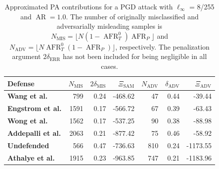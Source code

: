 \begin{table}[H]
    \centering
    \begin{tabular}{l|rrr|rrr}
    Defense & $N_{\text{MIS}}$ & $2 \delta_{\text{MIS}}$ & $\Xi_{\text{SAM}}$ & $N_{\text{ADV}}$ & $\delta_{\text{ADV}}$ & $\Xi_{\text{ADV}}$ \\
    \midrule
    {\color{tab:brown} \textbf{Wang et al.}} & 799 & 0.24 & -468.62 & 47 & 0.44 & -39.44 \\
    {\color{tab:blue} \textbf{Engstrom et al.}} & 1591 & 0.17 & -566.72 & 67 & 0.39 & -63.43 \\
    {\color{tab:red} \textbf{Wong et al.}} & 1562 & 0.17 & -537.25 & 90 & 0.38 & -88.98 \\
    {\color{tab:purple} \textbf{Addepalli et al.}} & 2063 & 0.21 & -877.42 & 75 & 0.46 & -58.92 \\
    {\color{tab:orange} \textbf{Undefended}} & 566 & 0.47 & -736.63 & 810 & 0.24 & -1173.55 \\
    {\color{tab:green} \textbf{Athalye et al.}} & 1915 & 0.23 & -963.85 & 747 & 0.21 & -1183.96 \\
    \bottomrule
    \end{tabular}
    \caption{
    Approximated PA contributions for a PGD attack with $\ell_\infty$ = 8/255 and
    $\operatorname{AR} = 1.0$. The number of originally misclassified and adversarially misleading
    samples is $N_{\text{MIS}} = \lfloor N (1-\operatorname{AFR}_T^0) \operatorname{AFR}_P \rfloor$ and
    $N_{\text{ADV}} = \lfloor N \operatorname{AFR}_T^0 (1-\operatorname{AFR}_P) \rfloor$, respectively. 
    The penalization argument $2 \delta_{\text{ERR}}$ has not
    been included for being negligible in all cases.
    }
    \label{tab:approx_pa_pgd_table}
\end{table}

